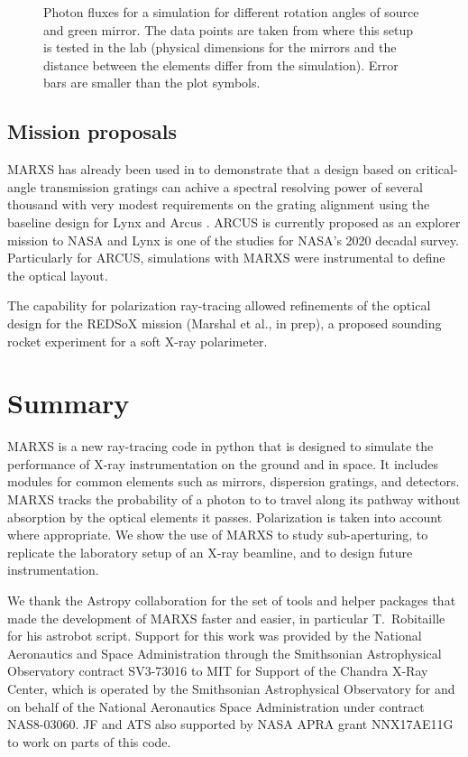\documentclass[twocolumn]{aastex61}
\begin{document}
\begin{figure}[ht!]
\caption{Photon fluxes for a simulation for different rotation angles of
source and green mirror. The data points are taken from \citet{2013SPIE.8861E..1DM} where this setup is tested in the lab (physical dimensions for the mirrors and the distance between the elements differ from the simulation). Error bars are smaller than the plot symbols.}
    \label{fig:polcurve}
\end{figure}



\subsection{Mission proposals}
\label{sect:use}
MARXS has already been used in \citet{2016SPIE.9905E..56G} to
demonstrate that a design based on critical-angle transmission
gratings \citep{doi:10.1117/12.2188525} can achive a spectral
resolving power of several thousand with very modest requirements on
the grating alignment using the baseline design for Lynx
\citep{doi:10.1117/12.2190837} and Arcus
\citep{doi:10.1117/12.2062671}. ARCUS is currently proposed as an
explorer mission to NASA and Lynx is one of the studies for NASA's 2020
decadal survey. Particularly for ARCUS, simulations with MARXS were
instrumental to define the optical layout.

The capability for polarization ray-tracing allowed refinements of the
optical design for the REDSoX mission (Marshal et al., in prep), a
proposed sounding rocket experiment for a soft X-ray polarimeter.


\section{Summary}
\label{sect:summary}
MARXS is a new ray-tracing code in python that is designed to simulate the
performance of X-ray instrumentation on the ground and in space. It includes
modules for common elements such as mirrors, dispersion gratings, and
detectors. MARXS tracks the probability of a photon to to travel along its
pathway without absorption by the optical elements it passes. Polarization is
taken into account where appropriate. We show the use of MARXS to study
sub-aperturing, to replicate the laboratory setup of an X-ray beamline, and to
design future instrumentation.

\acknowledgments 
We thank the Astropy collaboration for the set of tools and
helper packages that made the development of MARXS faster and easier, in
particular T.\ Robitaille for his astrobot script. Support for this work was
provided by the National Aeronautics and Space Administration through the
Smithsonian Astrophysical Observatory contract SV3-73016 to MIT for Support of
the Chandra X-Ray Center, which is operated by the Smithsonian Astrophysical
Observatory for and on behalf of the National Aeronautics Space Administration
under contract NAS8-03060. JF and ATS also supported by NASA APRA
grant NNX17AE11G to work on parts of this code.
\end{document}
